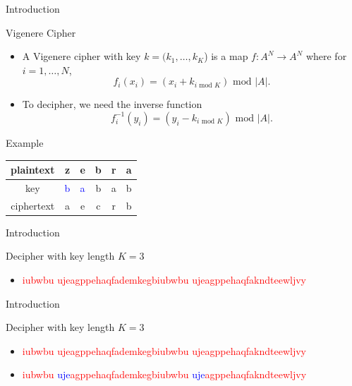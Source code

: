 \documentclass{beamer}
\begin{document}

\begin{frame}{Introduction}

\begin{block}{Vigenere Cipher \cite{vigenere1586}}
\begin{itemize}
\item A Vigenere cipher with key $k = (k_{1}, \ldots, k_{K}$) is a map $f: A^{N} \to A^{N}$ where for $i = 1, \ldots, N$,
$$f_{i}(x_{i}) = (x_{i} + k_{i \text{ mod } K}) \text{ mod } |A|.$$
\item To decipher, we need the inverse function 
$$f^{-1}_{i}(y_{i}) = (y_{i} - k_{i \text{ mod } K}) \text{ mod } |A|.$$
\end{itemize}
\end{block}

\begin{block}{Example}
\end{block}

\vspace{-12pt}

\begin{center}
\begin{tabular}{c|ccccc}
  plaintext & z & e & b & r & a \\
  \hline
  key & \textcolor{blue}{b} & \textcolor{blue}{a} & b & a & b \\
  \hline
  ciphertext & a & e & c & r & b \\
\end{tabular}
\end{center}

\end{frame}


\begin{frame}{Introduction}

\begin{block}{Decipher with key length $K=3$}
\begin{itemize}
\item \textcolor{red}{iubwbu ujeagppehaqfademkegbiubwbu ujeagppehaqfakndteewljvy}
\end{itemize}
\end{block}

\end{frame}


\begin{frame}{Introduction}

\begin{block}{Decipher with key length $K=3$}
\begin{itemize}
\item \textcolor{red}{iubwbu ujeagppehaqfademkegbiubwbu ujeagppehaqfakndteewljvy}
\item \textcolor{red}{iubwbu }\textcolor{blue}{uje}\textcolor{red}{agppehaqfademkegbiubwbu }\textcolor{blue}{uje}\textcolor{red}{agppehaqfakndteewljvy}
\end{itemize}
\end{block}

\end{frame}
  
\end{document}
